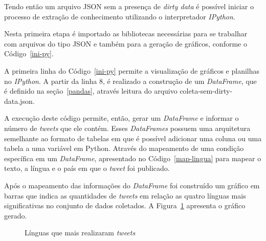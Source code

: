 Tendo então um arquivo JSON sem a presença de \textit{dirty data} é possível iniciar o processo de extração de conhecimento utilizando o interpretador \textit{IPython}.

Nesta primeira etapa é importado as bibliotecas necessárias para se trabalhar com arquivos do tipo JSON e também para a geração de gráficos, conforme o Código~\ref{ini-py}.



A primeira linha do Código~\ref{ini-py} permite a visualização de gráficos e planilhas no \textit{IPython}. A partir da linha 8, é realizado a construção de um \textit{DataFrame}, que é definido na seção~\ref{pandas}, através leitura do arquivo coleta-sem-dirty-data.json.

A execução deste código permite, então, gerar um \textit{DataFrame} e informar o número de \textit{tweets} que ele contém. Esses \textit{DataFrames} possuem uma arquitetura semelhante ao formato de tabelas em que é possível adicionar uma coluna ou uma tabela a uma variável em Python. Através do mapeamento de uma condição específica em um \textit{DataFrame}, apresentado no Código~\ref{map-lingua} para mapear o texto, a língua e o país em que o \textit{tweet} foi publicado.



Após o mapeamento das informações do \textit{DataFrame} foi construído um gráfico em barras que indica as quantidades de \textit{tweets} em relação as quatro línguas mais significativas no conjunto de dados coletados. A Figura~\ref{lingua} apresenta o gráfico gerado.

\begin{figure}[h]
	\centering
	\caption{Línguas que mais realizaram \textit{tweets}}
	\vspace{-0.3cm}
	\label{lingua}
\end{figure}

